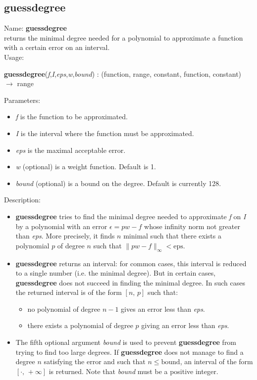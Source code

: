 \subsection{guessdegree}
\label{labguessdegree}
\noindent Name: \textbf{guessdegree}\\
returns the minimal degree needed for a polynomial to approximate a function with a certain error on an interval.\\
\noindent Usage: 
\begin{center}
\textbf{guessdegree}(\emph{f},\emph{I},\emph{eps},\emph{w},\emph{bound}) : (\textsf{function}, \textsf{range}, \textsf{constant}, \textsf{function}, \textsf{constant}) $\rightarrow$ \textsf{range}\\
\end{center}
Parameters: 
\begin{itemize}
\item \emph{f} is the function to be approximated.
\item \emph{I} is the interval where the function must be approximated.
\item \emph{eps} is the maximal acceptable error.
\item \emph{w} (optional) is a weight function. Default is 1.
\item \emph{bound} (optional) is a bound on the degree. Default is currently 128.
\end{itemize}
\noindent Description: \begin{itemize}

\item \textbf{guessdegree} tries to find the minimal degree needed to approximate \emph{f}
   on \emph{I} by a polynomial with an error $\epsilon=p w - f$ whose infinity norm not
   greater than \emph{eps}. More precisely, it finds $n$ minimal such that there exists
   a polynomial $p$ of degree $n$ such that $\|p w-f\|_{\infty} < \mathrm{eps}$.

\item \textbf{guessdegree} returns an interval: for common cases, this interval is reduced
   to a single number (i.e. the minimal degree). But in certain cases,
   \textbf{guessdegree} does not succeed in finding the minimal degree. In such cases the
   returned interval is of the form $[n,\,p]$ such that:
   \begin{itemize}
   \item no polynomial of degree $n-1$ gives an error less than \emph{eps}.
   \item there exists a polynomial of degree $p$ giving an error less than \emph{eps}.
   \end{itemize}

\item The fifth optional argument \emph{bound} is used to prevent \textbf{guessdegree} from
   trying to find too large degrees. If \textbf{guessdegree} does not manage to find a
   degree $n$ satisfying the error and such that $n \le \textrm{bound}$, an interval of the
   form $[\cdot,\,+\infty]$ is returned. Note that \emph{bound} must be a positive integer.
\end{itemize}
